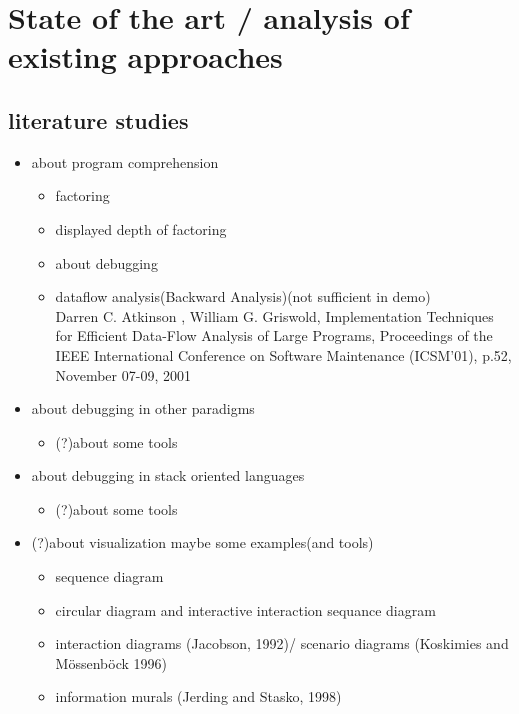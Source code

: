 \chapter{State of the art / analysis of existing approaches}

\section{literature studies}

\begin{itemize}
\item about program comprehension
	\begin{itemize} \item factoring \item displayed depth of factoring \end{itemize}
	\begin{itemize} \item about debugging \end{itemize}
	\begin{itemize}
	\item dataflow analysis(Backward Analysis)(not sufficient in demo) \\
		Darren C. Atkinson , William G. Griswold, Implementation Techniques for Efficient Data-Flow Analysis of Large Programs, Proceedings of the IEEE International Conference on Software Maintenance (ICSM'01), p.52, November 07-09, 2001
	\end{itemize}
\item about debugging in other paradigms
	\begin{itemize} \item (?)about some tools \end{itemize}
\item about debugging in stack oriented languages
	\begin{itemize} \item (?)about some tools \end{itemize}
\item (?)about visualization maybe some examples(and tools)
	\begin{itemize}
	\item sequence diagram
	\item circular diagram and interactive interaction sequance diagram \cite{Cornelissen2009}
	\item interaction diagrams (Jacobson, 1992)/ scenario diagrams (Koskimies and Mössenböck 1996)
	\item information murals (Jerding and Stasko, 1998)

\end{itemize}
\end{itemize}
